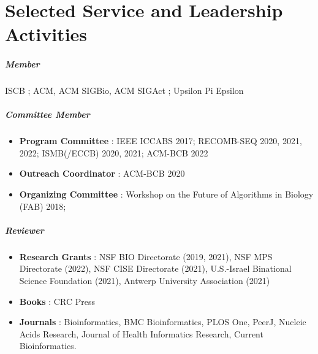 \documentclass[10pt,letterpaper]{article}
\begin{document}
\section*{Selected Service and Leadership Activities}
\subparagraph{Member} \hspace{1em}
ISCB
; ACM, ACM SIGBio, ACM SIGAct
; Upsilon Pi Epsilon

\subparagraph{Committee Member} 
\begin{itemize}[leftmargin=!,labelindent=5pt,itemindent=-15pt]
    \item \textbf{Program Committee} : IEEE ICCABS 2017; RECOMB-SEQ 2020, 2021, 2022; ISMB(/ECCB) 2020, 2021; ACM-BCB 2022
    \item \textbf{Outreach Coordinator} : ACM-BCB 2020
    \item \textbf{Organizing Committee} : Workshop on the Future of Algorithms in Biology (FAB) 2018; 
\end{itemize}

\subparagraph{Reviewer} 
\begin{itemize}[leftmargin=!,labelindent=5pt,itemindent=-15pt]
    \item \textbf{Research Grants} : 
    	NSF BIO Directorate (2019, 2021), 
	NSF MPS Directorate (2022),
    	NSF CISE Directorate (2021), 
	U.S.-Israel Binational Science Foundation (2021), 
	Antwerp University Association (2021)
    \item \textbf{Books} : 
    	CRC Press
    \item \textbf{Journals} :
        Bioinformatics,
        BMC Bioinformatics, 
        PLOS One, 
        PeerJ, 
        Nucleic Acids Research, 
        Journal of Health Informatics Research,
        Current Bioinformatics.
\end{itemize}
\end{document}
